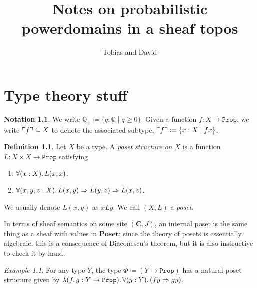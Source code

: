 \documentclass[11pt, oneside, article]{memoir}
\theoremstyle{plain}
\theoremstyle{definition}
\newtheorem{definition}[theorem]{Definition}
\newtheorem{notation}[theorem]{Notation}
\theoremstyle{remark}
\newtheorem{example}[theorem]{Example}
\renewcommand{\ss}{\subseteq}
\DeclarePairedDelimiter{\subtype}{\ulcorner}{\urcorner}
\newcommand{\const}[1]{\mathtt{#1}}
\newcommand{\Cat}[1]{\mathbf{#1}}
\newcommand{\QQ}{\mathbb{Q}}
\newcommand{\QQp}{\QQ_{+}}
\newcommand{\Prop}{\const{Prop}}
\newcommand{\Poset}{\Cat{Poset}}
\renewcommand{\C}{\Cat{C}}
\newcommand{\imp}{\Rightarrow}
\begin{document}
\title{Notes on probabilistic powerdomains in a sheaf topos}

\author{Tobias and David}

\maketitle

\tableofcontents*


\chapter{Type theory stuff}

\begin{notation}
We write $\QQp\coloneqq\{q:\QQ\mid q\geq0\}$. Given a function $f:X\to\Prop$, we write $\subtype{f}\ss X$ to denote the associated subtype, $\subtype{f}\coloneqq\{x:X\mid fx\}$.
\end{notation}

\begin{definition}
Let $X$ be a type. A \emph{poset structure on $X$} is a function $L:X\times X\to\Prop$ satisfying
\begin{enumerate}
	\item $\forall(x:X)\ldotp L(x,x)$.
	\item $\forall(x,y,z:X)\ldotp L(x,y)\imp L(y,z)\imp L(x,z)$.
\end{enumerate}
We usually denote $L(x,y)$ as $x L y$. We call $(X,L)$ a \emph{poset}.
\end{definition}

In terms of sheaf semantics on some site $(\C,J)$, an internal poset is the same thing as a sheaf with values in $\Poset$; since the theory of posets is essentially algebraic, this is a consequence of Diaconescu's theorem, but it is also instructive to check it by hand.

\begin{example}
For any type $Y$, the type $\Phi\coloneqq (Y\to\Prop)$ has a natural poset structure given by $\lambda(f,g:Y\to\Prop)\ldotp\forall(y:Y)\ldotp (fy\imp gy)$.
\end{example}
\end{document}
